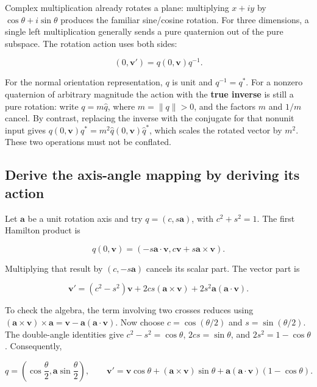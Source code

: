 \hypertarget{01-foundations-i-ch019-the-sandwich-turns-half-angles-into-a-full-rotation}{}

Complex multiplication already rotates a plane: multiplying \(x+iy\) by \(\cos\theta+i\sin\theta\) produces the familiar sine/cosine rotation. For three dimensions, a single left multiplication generally sends a pure quaternion out of the pure subspace. The rotation action uses both sides:

\[
(0,\mathbf v')=q(0,\mathbf v)q^{-1}.
\]

For the normal orientation representation, \(q\) is unit and \(q^{-1}=q^*\). For a nonzero quaternion of arbitrary magnitude the action with the \textbf{true inverse} is still a pure rotation: write \(q=m\widehat q\), where \(m=\|q\|>0\), and the factors \(m\) and \(1/m\) cancel. By contrast, replacing the inverse with the conjugate for that nonunit input gives \(q(0,\mathbf v)q^*=m^2\widehat q(0,\mathbf v)\widehat q^*\), which scales the rotated vector by \(m^2\). These two operations must not be conflated.

\subsection{Derive the axis-angle mapping by deriving its action}\label{01-foundations-i-ch019-derive-the-axis-angle-mapping-by-deriving-its-action}

\hypertarget{01-foundations-i-ch019-derive-the-axis-angle-mapping-by-deriving-its-action}{}

Let \(\mathbf a\) be a unit rotation axis and try \(q=(c,s\mathbf a)\), with \(c^2+s^2=1\). The first Hamilton product is

\[
q(0,\mathbf v)=
\left(-s\mathbf a\cdot\mathbf v,
c\mathbf v+s\mathbf a\times\mathbf v\right).
\]

Multiplying that result by \((c,-s\mathbf a)\) cancels its scalar part. The vector part is

\[
\mathbf v'=(c^2-s^2)\mathbf v
+2cs(\mathbf a\times\mathbf v)
+2s^2\mathbf a(\mathbf a\cdot\mathbf v).
\]

To check the algebra, the term involving two crosses reduces using \((\mathbf a\times\mathbf v)\times\mathbf a=\mathbf v-\mathbf a(\mathbf a\cdot\mathbf v)\). Now choose \(c=\cos(\theta/2)\) and \(s=\sin(\theta/2)\). The double-angle identities give \(c^2-s^2=\cos\theta\), \(2cs=\sin\theta\), and \(2s^2=1-\cos\theta\). Consequently,

\[
q=\left(\cos\frac\theta2,\mathbf a\sin\frac\theta2\right),
\qquad
\mathbf v'=\mathbf v\cos\theta
+(\mathbf a\times\mathbf v)\sin\theta
+\mathbf a(\mathbf a\cdot\mathbf v)(1-\cos\theta).
\]

